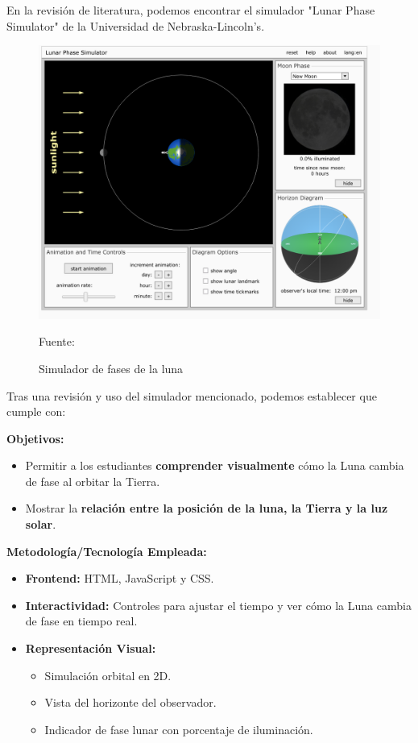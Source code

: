 En la revisión de literatura, podemos encontrar el simulador 
"Lunar Phase Simulator" de la Universidad de Nebraska-Lincoln’s. \cite{Ucar2014}

\begin{figure}[h]
    \includegraphics[scale = 0.5]{Imagenes/nebraska.png}
    \centering
    \caption{Simulador de fases de la luna}{Fuente: \cite{UNL2025}}
\end{figure}

Tras una revisión y uso del simulador mencionado, podemos establecer que 
cumple con: 

\textbf{Objetivos:}
\begin{itemize}
    \item Permitir a los estudiantes \textbf{comprender visualmente} cómo la Luna cambia de fase al orbitar la Tierra.
    \item Mostrar la \textbf{relación entre la posición de la luna, la Tierra y la luz solar}.
\end{itemize}

\textbf{Metodología/Tecnología Empleada:}
\begin{itemize}
    \item \textbf{Frontend:} HTML, JavaScript y CSS.
    \item \textbf{Interactividad:} Controles para ajustar el tiempo y ver cómo la Luna cambia de fase en tiempo real.
    \item \textbf{Representación Visual:}
    \begin{itemize}
        \item Simulación orbital en 2D.
        \item Vista del horizonte del observador.
        \item Indicador de fase lunar con porcentaje de iluminación.
    \end{itemize}
\end{itemize}

